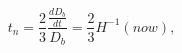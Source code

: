 \begin{equation}
t_n=\frac{2}{3}\frac{\frac{dD_b}{dt}}{D_b}=\frac{2}{3}H^{-1}(now),
\end{equation}

